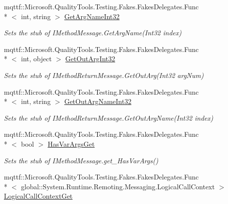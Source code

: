 \begin{DoxyCompactItemize}
mqttf\-::\-Microsoft.\-Quality\-Tools.\-Testing.\-Fakes.\-Fakes\-Delegates.\-Func\\*
$<$ int, string $>$ \hyperlink{class_system_1_1_runtime_1_1_remoting_1_1_messaging_1_1_fakes_1_1_stub_i_method_return_message_abb77c4a5cc1ed3a63c49b6d9d3bccb2c}{Get\-Arg\-Name\-Int32}
\begin{DoxyCompactList}\small\item\em Sets the stub of I\-Method\-Message.\-Get\-Arg\-Name(\-Int32 index)\end{DoxyCompactList}\item 
mqttf\-::\-Microsoft.\-Quality\-Tools.\-Testing.\-Fakes.\-Fakes\-Delegates.\-Func\\*
$<$ int, object $>$ \hyperlink{class_system_1_1_runtime_1_1_remoting_1_1_messaging_1_1_fakes_1_1_stub_i_method_return_message_a82dde4338a43d914e9fa97dede6151ba}{Get\-Out\-Arg\-Int32}
\begin{DoxyCompactList}\small\item\em Sets the stub of I\-Method\-Return\-Message.\-Get\-Out\-Arg(\-Int32 arg\-Num)\end{DoxyCompactList}\item 
mqttf\-::\-Microsoft.\-Quality\-Tools.\-Testing.\-Fakes.\-Fakes\-Delegates.\-Func\\*
$<$ int, string $>$ \hyperlink{class_system_1_1_runtime_1_1_remoting_1_1_messaging_1_1_fakes_1_1_stub_i_method_return_message_a19147134e1d385a9b32b90295df5316a}{Get\-Out\-Arg\-Name\-Int32}
\begin{DoxyCompactList}\small\item\em Sets the stub of I\-Method\-Return\-Message.\-Get\-Out\-Arg\-Name(\-Int32 index)\end{DoxyCompactList}\item 
mqttf\-::\-Microsoft.\-Quality\-Tools.\-Testing.\-Fakes.\-Fakes\-Delegates.\-Func\\*
$<$ bool $>$ \hyperlink{class_system_1_1_runtime_1_1_remoting_1_1_messaging_1_1_fakes_1_1_stub_i_method_return_message_abcb9b7025fc2c1b544512adee3b97821}{Has\-Var\-Args\-Get}
\begin{DoxyCompactList}\small\item\em Sets the stub of I\-Method\-Message.\-get\-\_\-\-Has\-Var\-Args()\end{DoxyCompactList}\item 
mqttf\-::\-Microsoft.\-Quality\-Tools.\-Testing.\-Fakes.\-Fakes\-Delegates.\-Func\\*
$<$ global\-::\-System.\-Runtime.\-Remoting.\-Messaging.\-Logical\-Call\-Context $>$ \hyperlink{class_system_1_1_runtime_1_1_remoting_1_1_messaging_1_1_fakes_1_1_stub_i_method_return_message_a7e20e3bb4ca4a5c70ecf99c5d395ccbf}{Logical\-Call\-Context\-Get}

\end{DoxyCompactItemize}
